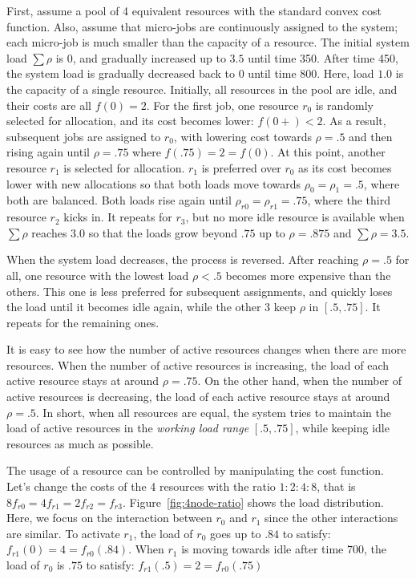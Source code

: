First, assume a pool of 4 equivalent resources with the standard convex
cost function.
Also, assume that micro-jobs are continuously assigned to the
system; each micro-job is much smaller than the capacity of a
resource.
The initial system load $\sum \rho$ is $0$, and gradually increased up
to $3.5$ until time 350. After time 450, the system load is gradually
decreased back to $0$ until time 800.
Here, load $1.0$ is the capacity of a single resource.
Initially, all resources in the pool are idle, and their costs are
all $f(0)= 2$.
For the first job, one resource $r_{0}$ is randomly selected for allocation, and its
cost becomes lower: $f(0+) < 2$. As a result, subsequent jobs are
assigned to $r_{0}$, with lowering cost towards $\rho = .5$ and then
rising again until $\rho = .75$ where $f(.75) = 2 = f(0)$.
At this point, another resource $r_{1}$ is selected for allocation.
$r_{1}$ is preferred over $r_{0}$ as its cost becomes lower with new
allocations so that both loads move towards $\rho_{0} = \rho_{1} = .5$,
where both are balanced.
Both loads rise again until $\rho_{r0} = \rho_{r1} = .75$,
where the third resource $r_{2}$ kicks in.
It repeats for $r_{3}$, but no more idle resource is available
when $\sum \rho$ reaches $3.0$ so that the loads grow beyond $.75$
up to $\rho = .875$ and $\sum \rho = 3.5$.

When the system load decreases, the process is reversed.
After reaching $\rho = .5$ for all,
one resource with the lowest load $\rho < .5$ becomes more expensive
than the others.
This one is less preferred for subsequent assignments, and quickly
loses the load until it becomes idle again, while the other 3 keep
$\rho$ in $[.5, .75]$. It repeats for the remaining ones.

It is easy to see how the number of active resources changes when
there are more resources.
When the number of active resources is increasing, the load of each
active resource stays at around $\rho = .75$.
On the other hand, when the number of active resources is decreasing,
the load of each active resource stays at around $\rho = .5$.
In short, when all resources are equal, the system tries to maintain
the load of active resources in the {\em working load range}
$[.5, .75]$, while keeping idle resources as much as possible.

The usage of a resource can be controlled by manipulating the cost
function.
Let's change the costs of the 4 resources with the ratio $1:2:4:8$,
that is $8 f_{r0} = 4 f_{r1} = 2 f_{r2} = f_{r3}$.
Figure~\ref{fig:4node-ratio} shows the load distribution.
Here, we focus on the interaction between $r_{0}$ and $r_{1}$ since
the other interactions are similar.
To activate $r_{1}$, the load of $r_{0}$ goes up to $.84$ to satisfy:
$f_{r1}(0) = 4 = f_{r0}(.84)$.
When $r_{1}$ is moving towards idle after time 700, the load
of $r_{0}$ is $.75$ to satisfy: $f_{r1}(.5) = 2 = f_{r0}(.75)$

